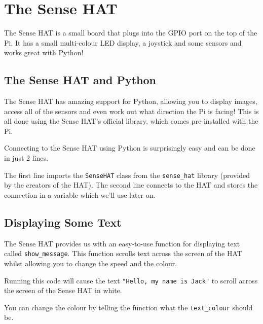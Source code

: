 \section{The Sense HAT}
	The Sense HAT is a small board that plugs into the GPIO port on the top of the Pi. It has a small multi-colour LED display, a joystick and some sensors and works great with Python!

	\subsection{The Sense HAT and Python}

		The Sense HAT has amazing support for Python, allowing you to display images, access all of the sensors and even work out what direction the Pi is facing! This is all done using the Sense HAT's official library, which comes pre-installed with the Pi.

		Connecting to the Sense HAT using Python is surprisingly easy and can be done in just 2 lines.

		

		The first line imports the \texttt{SenseHAT} class from the \texttt{sense\_hat} library (provided by the creators of the HAT). The second line connects to the HAT and stores the connection in a variable which we'll use later on.

	\subsection{Displaying Some Text}

		The Sense HAT provides us with an easy-to-use function for displaying text called \texttt{show\_message}. This function scrolls text across the screen of the HAT whilst allowing you to change the speed and the colour.

		

		Running this code will cause the text \texttt{"Hello, my name is Jack"} to scroll across the screen of the Sense HAT in white.

		\webclearpage

		You can change the colour by telling the function what the \texttt{text\_colour} should be.

		

